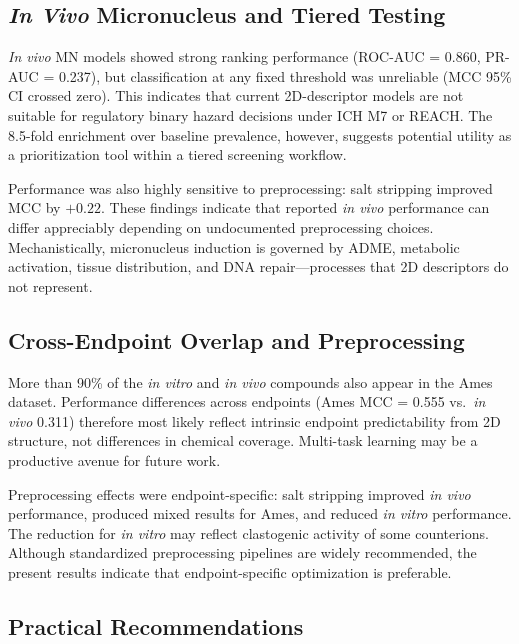 \subsection{\textit{In Vivo} Micronucleus and Tiered Testing}

\textit{In vivo} MN models showed strong ranking performance (ROC-AUC = 0.860, PR-AUC = 0.237), 
but classification at any fixed threshold was unreliable (MCC 95\% CI crossed zero). This 
indicates that current 2D-descriptor models are not suitable for regulatory binary hazard 
decisions under ICH M7\cite{ICH_M7_2017} or REACH.\cite{EU_REACH_2006} The 8.5-fold 
enrichment over baseline prevalence, however, suggests potential utility as a prioritization 
tool within a tiered screening workflow.\cite{Dobo_2012}

Performance was also highly sensitive to preprocessing: salt stripping improved MCC by 
$+0.22$. These findings indicate that reported \textit{in vivo} performance can differ appreciably depending 
on undocumented preprocessing choices.\cite{Fourches_2016} Mechanistically, micronucleus 
induction is governed by ADME, metabolic activation, tissue distribution, and DNA 
repair\cite{Tweats_2007,Kirkland_2011}---processes that 2D descriptors do not represent.

\subsection{Cross-Endpoint Overlap and Preprocessing}

More than 90\% of the \textit{in vitro} and \textit{in vivo} compounds also appear in the Ames dataset. 
Performance differences across endpoints (Ames MCC = 0.555 vs.\ \textit{in vivo} 0.311) therefore 
most likely reflect intrinsic endpoint predictability from 2D structure, not differences in 
chemical coverage.\cite{Tropsha_2010} Multi-task learning may be a productive avenue for 
future work.\cite{Ramsundar_2015}

Preprocessing effects were endpoint-specific: salt stripping improved \textit{in vivo} performance, 
produced mixed results for Ames, and reduced \textit{in vitro} performance. The reduction for 
\textit{in vitro} may reflect clastogenic activity of some counterions. Although standardized 
preprocessing pipelines are widely recommended,\cite{Fourches_2010,Fourches_2016} the 
present results indicate that endpoint-specific optimization is preferable.

\subsection{Practical Recommendations}

